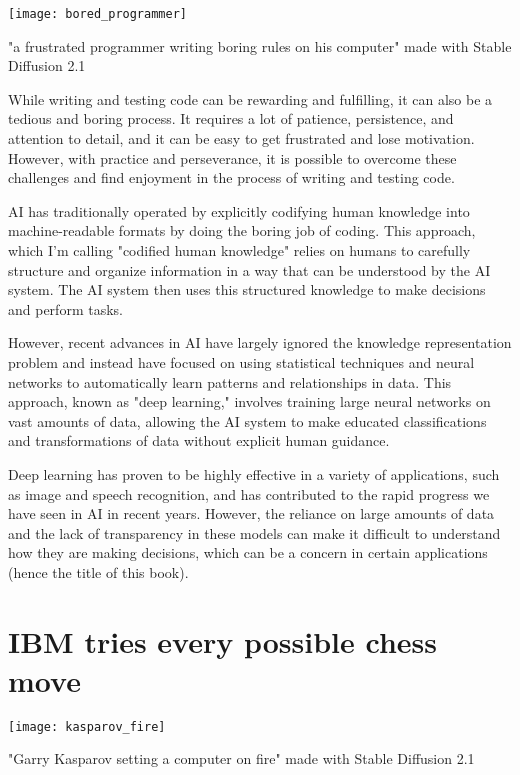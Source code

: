 \begin{marginfigure}[-5.5cm]
        \texttt{[image: bored\_programmer]}
        \caption{"a frustrated programmer writing boring rules on his computer" made with Stable Diffusion 2.1}
\end{marginfigure}

While writing and testing code can be rewarding and fulfilling, it can also be a tedious and boring process. It requires a lot of patience, persistence, and attention to detail, and it can be easy to get frustrated and lose motivation. However, with practice and perseverance, it is possible to overcome these challenges and find enjoyment in the process of writing and testing code.

AI has traditionally operated by explicitly codifying human knowledge into machine-readable formats by doing the boring job of coding. This approach, which I'm calling "codified human knowledge" relies on humans to carefully structure and organize information in a way that can be understood by the AI system. The AI system then uses this structured knowledge to make decisions and perform tasks.

However, recent advances in AI have largely ignored the knowledge representation problem and instead have focused on using statistical techniques and neural networks to automatically learn patterns and relationships in data. This approach, known as "deep learning," involves training large neural networks on vast amounts of data, allowing the AI system to make educated classifications and transformations of data without explicit human guidance.

Deep learning has proven to be highly effective in a variety of applications, such as image and speech recognition, and has contributed to the rapid progress we have seen in AI in recent years. However, the reliance on large amounts of data and the lack of transparency in these models can make it difficult to understand how they are making decisions, which can be a concern in certain applications (hence the title of this book).

\section{IBM tries every possible chess move}

\begin{marginfigure}[-5.5cm]
        \texttt{[image: kasparov\_fire]}
	\caption[Garry Kasparov]{"Garry Kasparov setting a computer on fire" made with Stable Diffusion 2.1}
\end{marginfigure}

